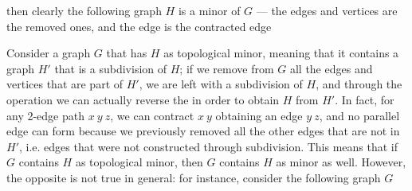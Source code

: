 \documentclass[a4paper, 12pt]{report}
\begin{document}
    then clearly the following graph $H$ is a minor of $G$ --- the  edges and vertices are the removed ones, and the  edge is the contracted edge

    \begin{figure}[H]
        \centering
    \end{figure}

    Consider a graph $G$ that has $H$ as topological minor, meaning that it contains a graph $H'$ that is a subdivision of $H$; if we remove from $G$ all the edges and vertices that are  part of $H'$, we are left with a subdivision of $H$, and through the  operation we can actually reverse the  in order to obtain $H$ from $H'$. In fact, for any 2-edge path $x \ y \ z$, we can contract $x \ y$ obtaining an edge $y \ z$, and no parallel edge can form because we previously removed all the other edges that are not in $H'$, i.e. edges that were not constructed through subdivision. This means that if $G$ contains $H$ as topological minor, then $G$ contains $H$ as minor as well. However, the opposite is not true in general: for instance, consider the following graph $G$
\end{document}
